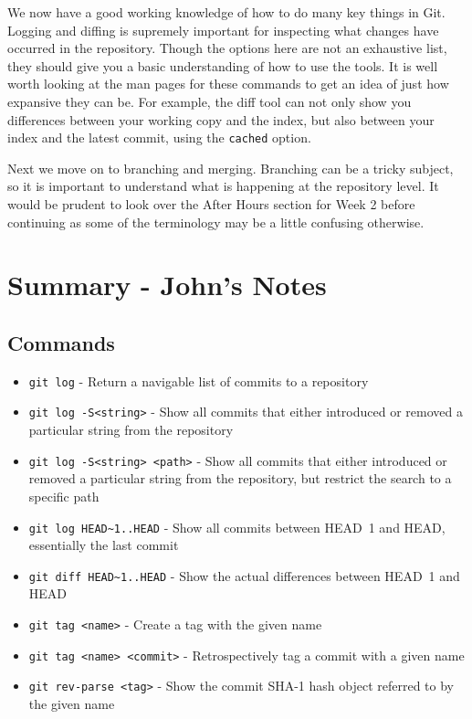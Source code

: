 We now have a good working knowledge of how to do many key things in Git.  Logging and diffing is supremely important for inspecting what changes have occurred in the repository.  Though the options here are not an exhaustive list, they should give you a basic understanding of how to use the tools.  It is well worth looking at the man pages for these commands to get an idea of just how expansive they can be.  For example, the diff tool can not only show you differences between your working copy and the index, but also between your index and the latest commit, using the \texttt{cached} option.

Next we move on to branching and merging.  Branching can be a tricky subject, so it is important to understand what is happening at the repository level.  It would be prudent to look over the After Hours section for Week 2 before continuing as some of the terminology may be a little confusing otherwise.

\clearpage

\section{Summary - John's Notes}
\subsection{Commands}
\begin{itemize}
\item\texttt{git log} - Return a navigable list of commits to a repository

\item\texttt{git log -S<string>} - Show all commits that either introduced or removed a particular string from the repository

\item\texttt{git log -S<string> <path>} - Show all commits that either introduced or removed a particular string from the repository, but restrict the search to a specific path

\item\texttt{git log HEAD\textasciitilde1..HEAD} - Show all commits between HEAD~1 and HEAD, essentially the last commit

\item\texttt{git diff HEAD\textasciitilde1..HEAD} - Show the actual differences between HEAD~1 and HEAD

\item\texttt{git tag <name>} - Create a tag with the given name

\item\texttt{git tag <name> <commit>} - Retrospectively tag a commit with a given name

\item\texttt{git rev-parse <tag>} - Show the commit SHA-1 hash object referred to by the given name
\end{itemize}

